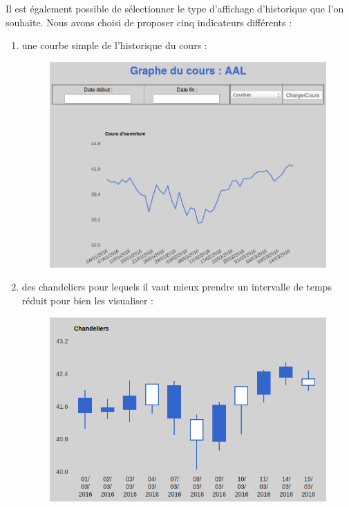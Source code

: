 \begin{enumerate}
      Il est également possible de sélectionner le type d'affichage d'historique que l'on souhaite. Nous avons choisi de proposer cinq indicateurs différents : 
      \begin{enumerate}
	\item une courbe simple de l'historique du cours :
	  \begin{figure}[H]
	    \center
	    \includegraphics[scale=0.5]{../graph/6-historiquecourbe.png}
	  \end{figure}
	\newpage  
	\item des chandeliers pour lequels il vaut mieux prendre un intervalle de temps réduit pour bien les visualiser : 
	  \begin{figure}[H]
	    \center
	    \includegraphics[scale=0.5]{../graph/6-historiquechandeliers.png}
	  \end{figure}

\end{enumerate}
\end{enumerate}
